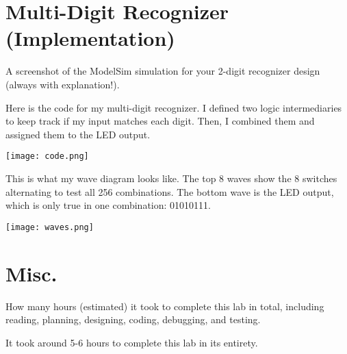 \documentclass{article}
\newenvironment{solution}{\begin{mdframed}[style=SolutionFrame]}{\end{mdframed}}
\begin{document}
\section{Multi-Digit Recognizer (Implementation)}
    A screenshot of the ModelSim simulation for your 2-digit recognizer design (always with explanation!).
    \begin{solution}
        Here is the code for my multi-digit recognizer. I defined two logic intermediaries to keep track if my input matches each digit. Then, I combined them and assigned them to the LED output.
        
        \begin{minipage}[t]{0.9\linewidth}
            \hspace{35pt}
            \texttt{[image: code.png]}
        \end{minipage}
        
        This is what my wave diagram looks like. The top 8 waves show the 8 switches alternating to test all 256 combinations. The bottom wave is the LED output, which is only true in one combination: 01010111.

        \begin{minipage}[t]{0.9\linewidth}
            \hspace{35pt}
            \texttt{[image: waves.png]}
        \end{minipage}
    \end{solution}

\section{Misc.}
    How many hours (estimated) it took to complete this lab in total, including reading, planning, designing, coding, debugging, and testing.
    \begin{solution}
        It took around 5-6 hours to complete this lab in its entirety.
    \end{solution}
\end{document}
